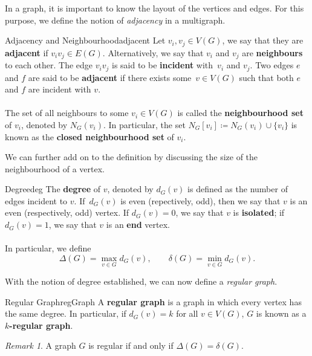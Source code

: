 \documentclass[math]{amznotes}
\theoremstyle{remark}
\newtheorem*{remark}{Remark}
\begin{document}
In a graph, it is important to know the layout of the vertices and edges. For this purpose, we define the notion of \textit{adjacency} in a multigraph.
\begin{dfnbox}{Adjacency and Neighbourhood}{adjacent}
    Let $v_i, v_j \in V(G)$, we say that they are {\color{red} \textbf{adjacent}} if $v_iv_j \in E(G)$. Alternatively, we say that $v_i$ and $v_j$ are {\color{red} \textbf{neighbours}} to each other. The edge $v_iv_j$ is said to be {\color{red} \textbf{incident}} with~$v_i$ and $v_j$. Two edges $e$ and $f$ are said to be {\color{red} \textbf{adjacent}} if there exists some~$v \in V(G)$ such that both $e$ and $f$ are incident with $v$. 
    \\\\
    The set of all neighbours to some $v_i \in V(G)$ is called the {\color{red} \textbf{neighbourhood set}} of $v_i$, denoted by $N_G(v_i)$. In particular, the set $N_G[v_i] \coloneqq N_G(v_i)\cup\{v_i\}$ is known as the {\color{red} \textbf{closed neighbourhood set}} of $v_i$.
\end{dfnbox}
We can further add on to the definition by discussing the size of the neighbourhood of a vertex.
\begin{dfnbox}{Degree}{deg}
    The {\color{red} \textbf{degree}} of $v$, denoted by $d_G(v)$ is defined as the number of edges incident to $v$. If~$d_G(v)$ is even (repectively, odd), then we say that $v$ is an even (respectively, odd) vertex. If $d_G(v) = 0$, we say that $v$ is {\color{red} \textbf{isolated}}; if $d_G(v) = 1$, we say that $v$ is an {\color{red} \textbf{end}} vertex. 
    \\\\
    In particular, we define
    \begin{equation*}
        \Delta(G) = \max_{v \in G}d_G(v), \qquad \delta(G) = \min_{v \in G}d_G(v).
    \end{equation*}
\end{dfnbox}
With the notion of degree established, we can now define a \textit{regular graph}.
\begin{dfnbox}{Regular Graph}{regGraph}
    A {\color{red} \textbf{regular graph}} is a graph in which every vertex has the same degree. In particular, if $d_G(v) = k$ for all $v \in V(G)$, $G$ is known as a {\color{red} \textbf{$k$-regular graph}}.
\end{dfnbox}
\begin{notebox}
    \begin{remark}
        A graph $G$ is regular if and only if $\Delta(G) = \delta(G)$.
    \end{remark}
\end{notebox}
\end{document}
